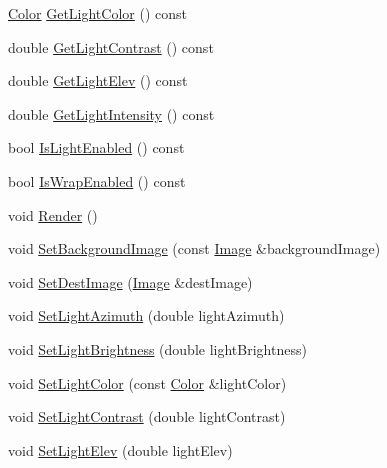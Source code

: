 \begin{DoxyCompactItemize}
\hyperlink{classnoise_1_1utils_1_1_color}{Color} \hyperlink{classnoise_1_1utils_1_1_renderer_image_aeddfe4c76285e98999aab2492bcccdaf}{Get\+Light\+Color} () const 
\item 
double \hyperlink{classnoise_1_1utils_1_1_renderer_image_a8a411fa5f3e79efa428868f8a3daa2f6}{Get\+Light\+Contrast} () const 
\item 
double \hyperlink{classnoise_1_1utils_1_1_renderer_image_a20f55af04669f1b2469d1beaa7968e3d}{Get\+Light\+Elev} () const 
\item 
double \hyperlink{classnoise_1_1utils_1_1_renderer_image_a17a7a45aa80c9b01ed3ed6a1c9fe0f26}{Get\+Light\+Intensity} () const 
\item 
bool \hyperlink{classnoise_1_1utils_1_1_renderer_image_aafdfe13e5ade3f63e4c111b00f14439b}{Is\+Light\+Enabled} () const 
\item 
bool \hyperlink{classnoise_1_1utils_1_1_renderer_image_ad629a8c6fb916a27be5d28a00aaaa66c}{Is\+Wrap\+Enabled} () const 
\item 
void \hyperlink{classnoise_1_1utils_1_1_renderer_image_a12013b5b684d98864e77b0ec87ad13d5}{Render} ()
\item 
void \hyperlink{classnoise_1_1utils_1_1_renderer_image_a7807fd07a12617e404727944b7d42872}{Set\+Background\+Image} (const \hyperlink{classnoise_1_1utils_1_1_image}{Image} \&background\+Image)
\item 
void \hyperlink{classnoise_1_1utils_1_1_renderer_image_a0face58e643a3ee56bdcdead4910c933}{Set\+Dest\+Image} (\hyperlink{classnoise_1_1utils_1_1_image}{Image} \&dest\+Image)
\item 
void \hyperlink{classnoise_1_1utils_1_1_renderer_image_a3f60f115936df731eddca38bcc96b67c}{Set\+Light\+Azimuth} (double light\+Azimuth)
\item 
void \hyperlink{classnoise_1_1utils_1_1_renderer_image_a979417b8ec28b6408c8a0ed4f60aec16}{Set\+Light\+Brightness} (double light\+Brightness)
\item 
void \hyperlink{classnoise_1_1utils_1_1_renderer_image_a015f4b32365e6f62285b9f741d122b8d}{Set\+Light\+Color} (const \hyperlink{classnoise_1_1utils_1_1_color}{Color} \&light\+Color)
\item 
void \hyperlink{classnoise_1_1utils_1_1_renderer_image_a295ef7be9f61214533a661cb94e8820a}{Set\+Light\+Contrast} (double light\+Contrast)
\item 
void \hyperlink{classnoise_1_1utils_1_1_renderer_image_a6456ef5e27556480c71e3a6c899bff3b}{Set\+Light\+Elev} (double light\+Elev)
\item 

\end{DoxyCompactItemize}

